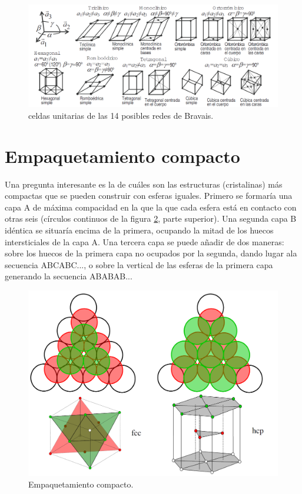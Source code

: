 \begin{figure}[h!] \centering
    \includegraphics[scale=0.7]{Cuerpo/Ch_01/Redes_bravais.png}
    \caption{celdas unitarias de las 14 posibles redes de Bravais.}
    \label{Fig:01-03}
\end{figure}

\section{Empaquetamiento compacto}

Una pregunta interesante es la de cuáles son las estructuras (cristalinas) más compactas que se pueden construir con esferas iguales. Primero se formaría una capa A de máxima compacidad en la que la que cada esfera está en contacto con otras seis (círculos continuos de la figura \ref{Fig:01-04}, parte superior). Una segunda capa B idéntica se situaría encima de la primera, ocupando la mitad de los huecos intersticiales de la capa A. Una tercera capa se puede añadir de dos maneras: sobre los huecos de la primera capa no ocupados por la segunda, dando lugar ala secuencia ABCABC..., o sobre la vertical de las esferas de la primera capa generando la secuencia ABABAB...

\begin{figure}[h!] \centering
    \includegraphics[scale=0.2]{Cuerpo/Ch_01/Empaquetamiento_compacto.png}
    \caption{Empaquetamiento compacto.}
    \label{Fig:01-04}
\end{figure}

